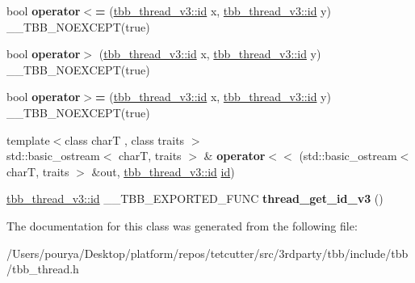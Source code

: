 \begin{DoxyCompactItemize}
\item 
\hypertarget{classtbb_1_1internal_1_1tbb__thread__v3_1_1id_aaf358e695ce2c3bc64029bb69b6b7841}{}bool {\bfseries operator$<$=} (\hyperlink{classtbb_1_1internal_1_1tbb__thread__v3_1_1id}{tbb\+\_\+thread\+\_\+v3\+::id} x, \hyperlink{classtbb_1_1internal_1_1tbb__thread__v3_1_1id}{tbb\+\_\+thread\+\_\+v3\+::id} y) \+\_\+\+\_\+\+T\+B\+B\+\_\+\+N\+O\+E\+X\+C\+E\+P\+T(true)\label{classtbb_1_1internal_1_1tbb__thread__v3_1_1id_aaf358e695ce2c3bc64029bb69b6b7841}

\item 
\hypertarget{classtbb_1_1internal_1_1tbb__thread__v3_1_1id_ad9277ffe4c9b7cdd4687d0cab4bf8cd8}{}bool {\bfseries operator$>$} (\hyperlink{classtbb_1_1internal_1_1tbb__thread__v3_1_1id}{tbb\+\_\+thread\+\_\+v3\+::id} x, \hyperlink{classtbb_1_1internal_1_1tbb__thread__v3_1_1id}{tbb\+\_\+thread\+\_\+v3\+::id} y) \+\_\+\+\_\+\+T\+B\+B\+\_\+\+N\+O\+E\+X\+C\+E\+P\+T(true)\label{classtbb_1_1internal_1_1tbb__thread__v3_1_1id_ad9277ffe4c9b7cdd4687d0cab4bf8cd8}

\item 
\hypertarget{classtbb_1_1internal_1_1tbb__thread__v3_1_1id_a9f559c30c06931effca0ee4a351d8fff}{}bool {\bfseries operator$>$=} (\hyperlink{classtbb_1_1internal_1_1tbb__thread__v3_1_1id}{tbb\+\_\+thread\+\_\+v3\+::id} x, \hyperlink{classtbb_1_1internal_1_1tbb__thread__v3_1_1id}{tbb\+\_\+thread\+\_\+v3\+::id} y) \+\_\+\+\_\+\+T\+B\+B\+\_\+\+N\+O\+E\+X\+C\+E\+P\+T(true)\label{classtbb_1_1internal_1_1tbb__thread__v3_1_1id_a9f559c30c06931effca0ee4a351d8fff}

\item 
\hypertarget{classtbb_1_1internal_1_1tbb__thread__v3_1_1id_a8dcf9ef009469428dc3752f54240eb69}{}{\footnotesize template$<$class char\+T , class traits $>$ }\\std\+::basic\+\_\+ostream$<$ char\+T, traits $>$ \& {\bfseries operator$<$$<$} (std\+::basic\+\_\+ostream$<$ char\+T, traits $>$ \&out, \hyperlink{classtbb_1_1internal_1_1tbb__thread__v3_1_1id}{tbb\+\_\+thread\+\_\+v3\+::id} \hyperlink{classtbb_1_1internal_1_1tbb__thread__v3_1_1id}{id})\label{classtbb_1_1internal_1_1tbb__thread__v3_1_1id_a8dcf9ef009469428dc3752f54240eb69}

\item 
\hypertarget{classtbb_1_1internal_1_1tbb__thread__v3_1_1id_a0a77bf86c87119e219bb508d787d97da}{}\hyperlink{classtbb_1_1internal_1_1tbb__thread__v3_1_1id}{tbb\+\_\+thread\+\_\+v3\+::id} \+\_\+\+\_\+\+T\+B\+B\+\_\+\+E\+X\+P\+O\+R\+T\+E\+D\+\_\+\+F\+U\+N\+C {\bfseries thread\+\_\+get\+\_\+id\+\_\+v3} ()\label{classtbb_1_1internal_1_1tbb__thread__v3_1_1id_a0a77bf86c87119e219bb508d787d97da}

\end{DoxyCompactItemize}


The documentation for this class was generated from the following file\+:\begin{DoxyCompactItemize}
\item 
/\+Users/pourya/\+Desktop/platform/repos/tetcutter/src/3rdparty/tbb/include/tbb/tbb\+\_\+thread.\+h\end{DoxyCompactItemize}
